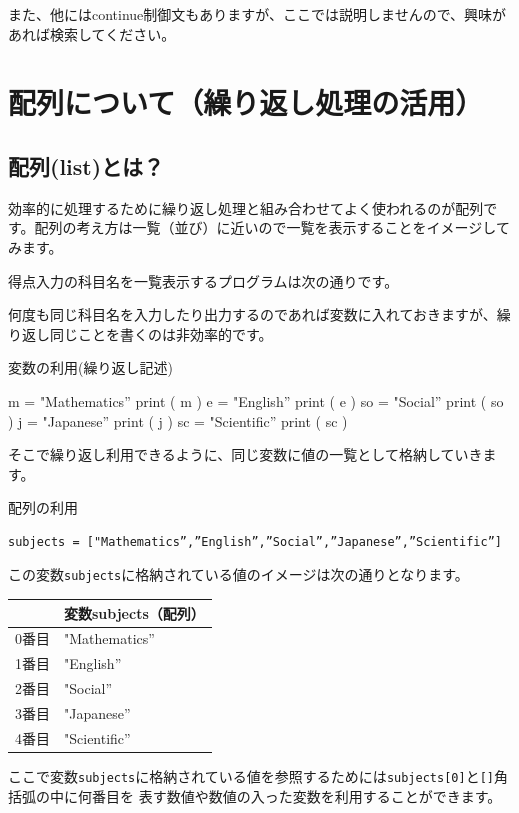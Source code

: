 \documentclass[11pt,a4paper,dvipdfmx,titlepage]{jsreport}
\begin{document}
また、他にはcontinue制御文もありますが、ここでは説明しませんので、興味があれば検索してください。

\newpage
\section{配列について（繰り返し処理の活用）}

\subsection{配列(list)とは？}

効率的に処理するために繰り返し処理と組み合わせてよく使われるのが配列です。配列の考え方は一覧（並び）に近いので一覧を表示することをイメージしてみます。

得点入力の科目名を一覧表示するプログラムは次の通りです。

何度も同じ科目名を入力したり出力するのであれば変数に入れておきますが、繰り返し同じことを書くのは非効率的です。
\begin{grabox}{変数の利用(繰り返し記述)}
\begin{listing}{1}
m = "Mathematics”
print ( m )
e = "English”
print ( e )
so = "Social”
print ( so )
j = "Japanese”
print ( j )
sc = "Scientific”
print ( sc )
\end{listing}
\end{grabox}

そこで繰り返し利用できるように、同じ変数に値の一覧として格納していきます。
\begin{grabox}{配列の利用}
\begin{verbatim}
subjects = ["Mathematics”,”English”,”Social”,”Japanese”,”Scientific”]
\end{verbatim}
この変数{\tt subjects}に格納されている値のイメージは次の通りとなります。
 \begin{center}
\begin{tabular}{|c|p{5cm}|} \hline
      & 変数subjects（配列）       \\ \hline \hline
0番目  & "Mathematics”  \\ \hline
1番目  & "English”      \\ \hline
2番目  & "Social”       \\ \hline
3番目  & "Japanese”     \\ \hline
4番目  & "Scientific”   \\ \hline
\end{tabular}
\end{center}
\end{grabox}
ここで変数{\tt subjects}に格納されている値を参照するためには{\tt subjects[0]}と{\tt []}角括弧の中に何番目を
表す数値や数値の入った変数を利用することができます。
\end{document}
